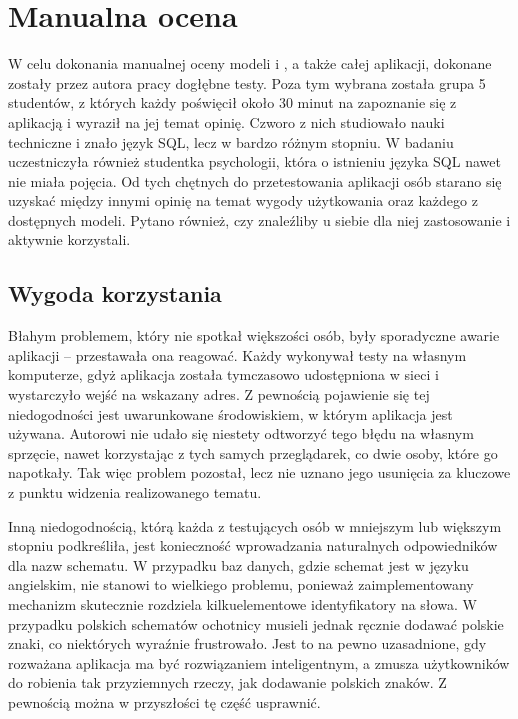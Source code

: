 \section{Manualna ocena}
W celu dokonania manualnej oceny modeli  i , a także całej aplikacji, dokonane zostały przez autora pracy dogłębne testy. Poza tym wybrana została grupa 5 studentów, z których każdy poświęcił około 30 minut na zapoznanie się z aplikacją i wyraził na jej temat opinię. Czworo z nich studiowało nauki techniczne i znało język SQL, lecz w bardzo różnym stopniu. W badaniu uczestniczyła również studentka psychologii, która o istnieniu języka SQL nawet nie miała pojęcia. Od tych chętnych do przetestowania aplikacji osób starano się uzyskać między innymi opinię na temat wygody użytkowania oraz każdego z dostępnych modeli. Pytano również, czy znaleźliby u siebie dla niej zastosowanie i aktywnie korzystali.

\subsection{Wygoda korzystania}
Błahym problemem, który nie spotkał większości osób, były sporadyczne awarie aplikacji -- przestawała ona reagować. Każdy wykonywał testy na własnym komputerze, gdyż aplikacja została tymczasowo udostępniona w sieci i wystarczyło wejść na wskazany adres. Z pewnością pojawienie się tej niedogodności jest uwarunkowane środowiskiem, w którym aplikacja jest używana. Autorowi nie udało się niestety odtworzyć tego błędu na własnym sprzęcie, nawet korzystając z tych samych przeglądarek, co dwie osoby, które go napotkały. Tak więc problem pozostał, lecz nie uznano jego usunięcia za kluczowe z punktu widzenia realizowanego tematu.

Inną niedogodnością, którą każda z testujących osób w mniejszym lub większym stopniu podkreśliła, jest konieczność wprowadzania naturalnych odpowiedników dla nazw schematu. W przypadku baz danych, gdzie schemat jest w języku angielskim, nie stanowi to wielkiego problemu, ponieważ zaimplementowany mechanizm skutecznie rozdziela kilkuelementowe identyfikatory na słowa. W przypadku polskich schematów ochotnicy musieli jednak ręcznie dodawać polskie znaki, co niektórych wyraźnie frustrowało. Jest to na pewno uzasadnione, gdy rozważana aplikacja ma być rozwiązaniem inteligentnym, a zmusza użytkowników do robienia tak przyziemnych rzeczy, jak dodawanie polskich znaków. Z pewnością można w przyszłości tę część usprawnić.

